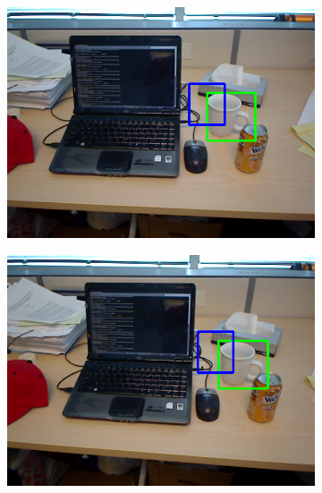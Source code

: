 \begin{figure}
	\centering
	\begin{subfigure}[b]{0.3\textwidth}
		\includegraphics[width=\textwidth]{img/seguimiento_frame_template/frame_template-desk_1-coffee_mug_5-frame_26.png}
	\end{subfigure}
	\begin{subfigure}[b]{0.3\textwidth}
		\includegraphics[width=\textwidth]{img/seguimiento_frame_template/frame_template-desk_1-coffee_mug_5-frame_27.png}
	\end{subfigure}
	\begin{subfigure}[b]{0.3\textwidth}

\end{subfigure}
\end{figure}
